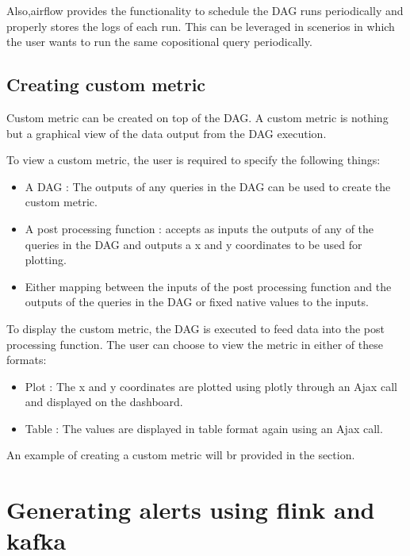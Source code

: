 \documentclass[letterpaper,10pt,english]{sphinxmanual}
\begin{document}
Also,airflow provides the functionality to schedule the DAG runs periodically and properly stores the logs of each run. This can be leveraged in scenerios in which the user wants to run the same copositional query periodically.


\section{Creating custom metric}
\label{\detokenize{dag:creating-custom-metric}}
Custom metric can be created on top of the DAG. A custom metric is nothing but a graphical view of the data output from the DAG execution.

To view a custom metric, the user is required to specify the following things:
\begin{itemize}
\item {} 
A DAG : The outputs of any queries in the DAG can be used to create the custom metric.

\item {} 
A post processing function : accepts as inputs the outputs of any of the queries in the DAG and outputs a x and y coordinates to be used for plotting.

\item {} 
Either mapping between the inputs of the post processing function and the outputs of the queries in the DAG or fixed native values to the inputs.

\end{itemize}

To display the custom metric, the DAG is executed to feed data into the post processing function. The user can choose to view the metric in either of these formats:
\begin{itemize}
\item {} 
Plot : The x and y coordinates are plotted using plotly through an Ajax call and displayed on the dashboard.

\item {} 
Table : The values are displayed in table format again using an Ajax call.

\end{itemize}

An example of creating a custom metric will br provided in the {\hyperref[\detokenize{dashboard_website:dashboard-website}]{}} section.


\chapter{Generating alerts using flink and kafka}
\label{\detokenize{flink:generating-alerts-using-flink-and-kafka}}\label{\detokenize{flink::doc}}
\end{document}
